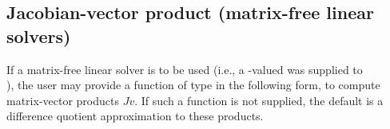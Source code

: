 \subsection{Jacobian-vector product (matrix-free linear solvers)}\label{ss:jtimesFn}

If a matrix-free linear solver is to be used (i.e., a -valued
{\sunmatrix} was supplied to \\ \noindent {}), the user may
provide a function of type  in the following form,
to compute matrix-vector products $Jv$. If such a function is not supplied,
the default is a difference quotient approximation to these products.

